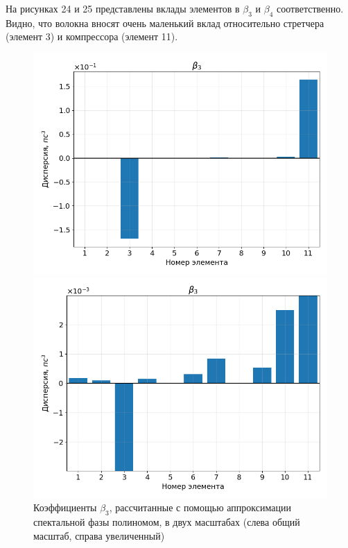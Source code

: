 \documentclass[12pt]{article}
\begin{document}
На рисунках 24 и 25 представлены вклады элементов в $\beta_3$ и $\beta_4$ соответственно. Видно, что волокна вносят
очень маленький вклад относительно стретчера (элемент 3) и компрессора (элемент 11).

\begin{figure}[h!]
    \centering
    \begin{minipage}[b]{0.5\textwidth}
        \includegraphics[width=\linewidth]{Images/Gauss Pulse without 15-19/Беты/beta_3_full}
    \end{minipage}%
    \begin{minipage}[b]{0.5\textwidth}
        \includegraphics[width=\linewidth]{Images/Gauss Pulse without 15-19/Беты/beta_3_cut}
    \end{minipage}

    \caption{Коэффициенты $\beta_3$, рассчитанные с помощью аппроксимации спектальной фазы полиномом,
     в двух масштабах (слева общий масштаб, справа увеличенный)}
    \label{fig:both}
\end{figure}
\end{document}
